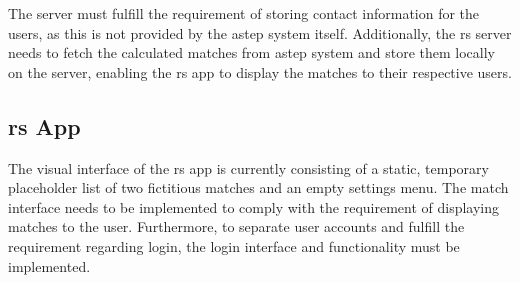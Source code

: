 The server must fulfill the requirement of storing contact information for the users, as this is not provided by the \gls{astep} system itself.
Additionally, the \gls{rs} server needs to fetch the calculated matches from \gls{astep} system and store them locally on the server, enabling the \gls{rs} app to display the matches to their respective users.


\subsection{\gls{rs} App}
The visual interface of the \gls{rs} app is currently consisting of a static, temporary placeholder list of two fictitious matches and an empty settings menu.
The match interface needs to be implemented to comply with the requirement of displaying matches to the user. 
Furthermore, to separate user accounts and fulfill the requirement regarding login, the login interface and functionality must be implemented.